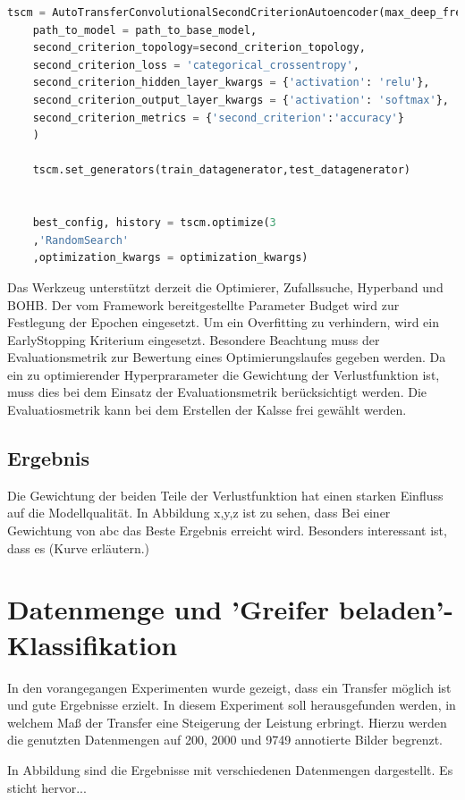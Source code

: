 	\begin{lstlisting}[language=python,caption=Beispiel AutoTransferSecondCriterionAutoenocder in Python, label=lst:BspAutoTransferSecondCriterionAutoenocder]
	tscm = AutoTransferConvolutionalSecondCriterionAutoencoder(max_deep_freeze=2,
	path_to_model = path_to_base_model,            
	second_criterion_topology=second_criterion_topology,
	second_criterion_loss = 'categorical_crossentropy',                                                                                                   
	second_criterion_hidden_layer_kwargs = {'activation': 'relu'},
	second_criterion_output_layer_kwargs = {'activation': 'softmax'},
	second_criterion_metrics = {'second_criterion':'accuracy'}
	)
	
	tscm.set_generators(train_datagenerator,test_datagenerator)
	
	
	best_config, history = tscm.optimize(3
	,'RandomSearch'
	,optimization_kwargs = optimization_kwargs)
	\end{lstlisting}
	Das Werkzeug unterstützt derzeit die Optimierer, Zufallssuche, Hyperband und BOHB. Der vom Framework bereitgestellte Parameter Budget wird zur Festlegung der Epochen eingesetzt. Um ein Overfitting zu verhindern, wird ein EarlyStopping Kriterium eingesetzt. 
	Besondere Beachtung muss der Evaluationsmetrik zur Bewertung eines Optimierungslaufes gegeben werden. Da ein zu optimierender Hyperprarameter die Gewichtung der Verlustfunktion ist, muss dies bei dem Einsatz der Evaluationsmetrik berücksichtigt werden. Die Evaluatiosmetrik kann bei dem Erstellen der Kalsse frei gewählt werden.
	
	\subsection{Ergebnis}
	Die Gewichtung der beiden Teile der Verlustfunktion hat einen starken Einfluss auf die Modellqualität. In Abbildung x,y,z  ist zu sehen, dass Bei einer Gewichtung von abc das Beste Ergebnis erreicht wird. Besonders interessant ist, dass es  (Kurve erläutern.)
	
	
	\section{Datenmenge und 'Greifer beladen'-Klassifikation}
		In den vorangegangen Experimenten wurde gezeigt, dass ein Transfer möglich ist und gute Ergebnisse erzielt. In diesem Experiment soll herausgefunden werden, in welchem Maß der Transfer eine Steigerung der Leistung erbringt. Hierzu werden die genutzten Datenmengen auf 200, 2000 und 9749 annotierte Bilder begrenzt.
		
		In Abbildung  sind die Ergebnisse mit verschiedenen Datenmengen dargestellt. Es sticht hervor... 
		
			
		
		
		
		
		
		
		
		
		
		
		
		
		
		
		
		
		
			
		
		
		
		
		
		
		
	
	